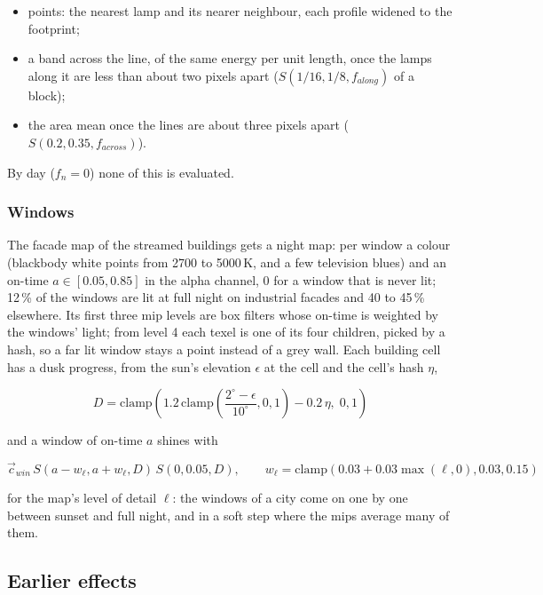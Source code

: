\documentclass[Orbiter Technical Reference.tex]{subfiles}
\begin{document}
\begin{sloppypar}
\begin{itemize}
\item points: the nearest lamp and its nearer neighbour, each profile widened to the footprint;
\item a band across the line, of the same energy per unit length, once the lamps along it are less than about two pixels apart ($S(1/16, 1/8, f_{along})$ of a block);
\item the area mean once the lines are about three pixels apart ($S(0.2, 0.35, f_{across})$).
\end{itemize}

\noindent
By day ($f_{n} = 0$) none of this is evaluated.

\subsubsection{Windows}
The facade map of the streamed buildings gets a night map: per window a colour (blackbody white points from 2700 to 5000\,K, and a few television blues) and an on-time $a \in [0.05, 0.85]$ in the alpha channel, 0 for a window that is never lit; 12\,\% of the windows are lit at full night on industrial facades and 40 to 45\,\% elsewhere. Its first three mip levels are box filters whose on-time is weighted by the windows' light; from level 4 each texel is one of its four children, picked by a hash, so a far lit window stays a point instead of a grey wall. Each building cell has a dusk progress, from the sun's elevation $\epsilon$ at the cell and the cell's hash $\eta$,

\[ D = \mathrm{clamp}\left(1.2\,\mathrm{clamp}\left(\frac{2^{\circ} - \epsilon}{10^{\circ}}, 0, 1\right) - 0.2\,\eta,\; 0, 1\right) \]

\noindent
and a window of on-time $a$ shines with

\[ \vec{c}_{win}\,S(a - w_{\ell}, a + w_{\ell}, D)\,S(0, 0.05, D), \qquad w_{\ell} = \mathrm{clamp}(0.03 + 0.03\max(\ell, 0), 0.03, 0.15) \]

\noindent
for the map's level of detail $\ell$: the windows of a city come on one by one between sunset and full night, and in a soft step where the mips average many of them.



\subsection{Earlier effects}\label{sec:vk_early}

\end{sloppypar}
\end{document}
